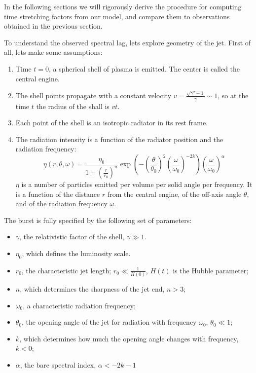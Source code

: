 \documentclass{article}
\begin{document}
In the following sections we will rigorously derive the procedure for computing time stretching factors from our model, and compare them to observations obtained in the previous section.

To understand the observed spectral lag, lets explore geometry of the jet. First of all, lets make some assumptions:
\begin{enumerate}
\item{Time $t = 0$, a spherical shell of plasma is emitted. The center is called the central engine.}
\item{The shell points propagate with a constant velocity $v = \frac{\sqrt{\gamma^2 - 1}}{\gamma} \sim 1$, so at the time $t$ the radius of the shall is $v t$.}
\item{Each point of the shell is an isotropic radiator in its rest frame.}
\item{
	The radiation intensity is a function of the radiator position and the radiation frequency:
	\begin{equation}
		\eta\left(r,\theta,\omega\right) = 
		\frac{\eta_0}{1 + \left(\frac{r}{r_0}\right)^n}
		\exp\left(
			-\left(\frac{\theta}{\theta_0}\right)^2
			\left(\frac{\omega}{\omega_0}\right)^{-2k}
		\right)
		\left(\frac{\omega}{\omega_0}\right)^\alpha
	\end{equation}
	$\eta$ is a number of particles emitted per volume per solid angle per frequency. It is a function of the distance $r$ from the central engine, of the off-axis angle $\theta$, and of the radiation frequency $\omega$.
}
\end{enumerate}

The burst is fully specified by the following set of parameters:
\begin{itemize}
\item{$\gamma$, the relativistic factor of the shell, $\gamma \gg 1$.}
\item{$\eta_0$, which defines the luminosity scale.}
\item{$r_0$, the characteristic jet length; $r_0 \ll \frac{1}{H\left(0\right)}$, $H\left(t\right)$ is the Hubble parameter;}
\item{$n$, which determines the sharpness of the jet end, $n > 3$;}
\item{$\omega_0$, a characteristic radiation frequency;}
\item{$\theta_0$, the opening angle of the jet for radiation with frequency $\omega_0$, $\theta_0 \ll 1$;}
\item{$k$, which determines how much the opening angle changes with frequency, $k < 0$;}
\item{$\alpha$, the bare spectral index, $\alpha < -2k - 1$}
\end{itemize}
\end{document}
